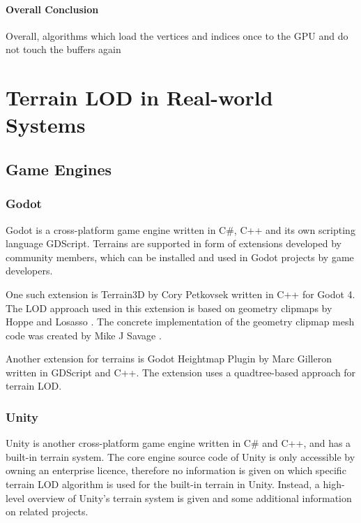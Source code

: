 \paragraph{Overall Conclusion}
Overall, algorithms which load the vertices and indices once to the GPU and do not touch the buffers again 


\section{Terrain LOD in Real-world Systems}
\subsection{Game Engines}
\subsubsection{Godot}
Godot is a cross-platform game engine written in C\#, C++ and its own scripting language GDScript.
Terrains are supported in form of extensions developed by community members, 
which can be installed and used in Godot projects by game developers.

One such extension is Terrain3D by Cory Petkovsek \cite{godotterrain3dgithub} 
written in C++ for Godot 4. The LOD approach used in this extension is based on 
geometry clipmaps by Hoppe and Losasso \cite{geomclipmaps}. %
The concrete implementation
of the geometry clipmap mesh code was created by Mike J Savage \cite{geomclipmapssavage}. 

Another extension for terrains is Godot Heightmap Plugin by Marc Gilleron \cite{godotheightmapplugingithub} written in GDScript and C++.
The extension uses a quadtree-based approach for terrain LOD. 

\subsubsection{Unity}
Unity is another cross-platform game engine written in C\# and C++, and has a 
built-in terrain system. 
The core engine source code of Unity is only accessible
by owning an enterprise licence, therefore no information is given on which 
specific terrain LOD algorithm is used for the built-in terrain in Unity.
Instead, a high-level overview of Unity's terrain system is given 
and some additional information on related projects.

